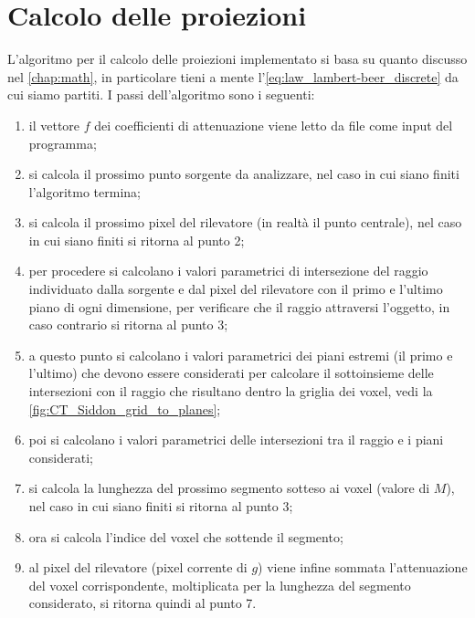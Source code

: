 \documentclass[12pt,a4paper]{report}
\begin{document}
\section{Calcolo delle proiezioni}

L'algoritmo per il calcolo delle proiezioni implementato si basa su quanto discusso nel \autoref{chap:math}, in particolare tieni
a mente l'\autoref{eq:law_lambert-beer_discrete} da cui siamo partiti. I passi dell'algoritmo sono i seguenti:
\begin{enumerate}
  \item il vettore \(f\) dei coefficienti di attenuazione viene letto da file come input del programma;
  \item si calcola il prossimo punto sorgente da analizzare, nel caso in cui siano finiti l'algoritmo termina;
  \item si calcola il prossimo pixel del rilevatore (in realtà il punto centrale), nel caso in cui siano finiti si ritorna al
        punto 2;
  \item per procedere si calcolano i valori parametrici di intersezione del raggio individuato dalla sorgente e dal pixel del
        rilevatore con il primo e l'ultimo piano di ogni dimensione, per verificare che il raggio attraversi l'oggetto, in caso
        contrario si ritorna al punto 3;
  \item a questo punto si calcolano i valori parametrici dei piani estremi (il primo e l'ultimo) che devono essere considerati per
        calcolare il sottoinsieme delle intersezioni con il raggio che risultano dentro la griglia dei voxel, vedi la
        \autoref{fig:CT_Siddon_grid_to_planes};
  \item poi si calcolano i valori parametrici delle intersezioni tra il raggio e i piani considerati;
  \item si calcola la lunghezza del prossimo segmento sotteso ai voxel (valore di \(M\)), nel caso in cui siano finiti si ritorna
        al punto 3;
  \item ora si calcola l'indice del voxel che sottende il segmento;
  \item al pixel del rilevatore (pixel corrente di \(g\)) viene infine sommata l'attenuazione del voxel corrispondente,
        moltiplicata per la lunghezza del segmento considerato, si ritorna quindi al punto 7.
\end{enumerate}
\end{document}
